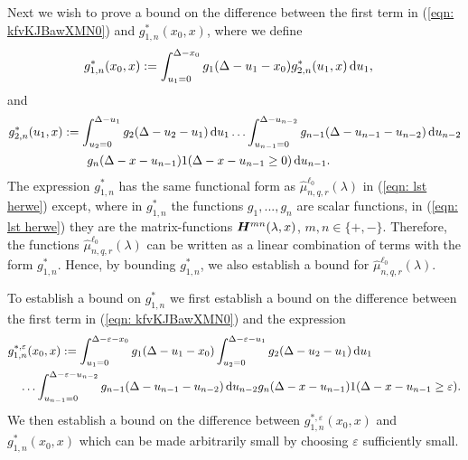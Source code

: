 Next we wish to prove a bound on the difference between the first term in (\ref{eqn: kfvKJBawXMN0}) and \(g^*_{1,n}(x_0,x)\), where we define 
	\begin{align}
		g^*_{1,n}(x_0,x) &:= \int_{u_1=0}^{\Delta-x_0}g_1(\Delta - u_1 - x_0)g^*_{2,n}(u_1,x)\, \mathrm{d} u_1,
	\end{align}
	and
	\begin{align}
		g^*_{2,n}(u_1,x) &:= \int_{u_2=0}^{\Delta-u_1}g_2(\Delta - u_2 - u_1)\, \mathrm{d} u_1 \dots \nonumber 
            	\int_{u_{n-1}=0}^{\Delta-u_{n-2}} g_{n-1}(\Delta - u_{n-1} - u_{n-2}) \, \mathrm{d} u_{n-2}
            	\\&\qquad{}g_{n}(\Delta - x-u_{n-1})1(\Delta-x-u_{n-1}\geq0)\, \mathrm{d} u_{n-1}.
	\end{align}
	The expression \(g^*_{1,n}\) has the same functional form as \(\widehat \mu^{\ell_0}_{n,q,r}(\lambda)\) in (\ref{eqn: lst herwe}) except, where in \(g^*_{1,n}\) the functions \(g_1,...,g_n\) are scalar functions, in (\ref{eqn: lst herwe}) they are the matrix-functions \(\boldsymbol H^{mn}(\lambda,x)\), \(m,n\in\{+,-\}\). Therefore, the functions \(\widehat \mu^{\ell_0}_{n,q,r}(\lambda)\) can be written as a linear combination of terms with the form \(g^*_{1,n}\). Hence, by bounding \(g^*_{1,n}\), we also establish a bound for \(\widehat \mu^{\ell_0}_{n,q,r}(\lambda)\).

To establish a bound on \(g^*_{1,n}\) we first establish a bound on the difference between the first term in (\ref{eqn: kfvKJBawXMN0}) and the expression 
	\begin{align}
		&g^{*,\varepsilon}_{1,n}(x_0,x) := 
		\int_{u_1=0}^{\Delta-\varepsilon-x_0}g_1(\Delta - u_1 - x_0)
		\int_{u_2=0}^{\Delta-\varepsilon-u_1}g_2(\Delta - u_2 - u_1)\, \mathrm{d} u_1  \nonumber 
		\\&\quad\hdots 
            	\int_{u_{n-1}=0}^{\Delta-\varepsilon-u_{n-2}} g_{n-1}(\Delta - u_{n-1} - u_{n-2}) \, \mathrm{d} u_{n-2}
            	g_{n}(\Delta-x-u_{n-1}) 
		1(\Delta-x-u_{n-1}\geq\varepsilon).
	\end{align}
	We then establish a bound on the difference between \(g^{*,\varepsilon}_{1,n}(x_0,x)\) and \(g^{*}_{1,n}(x_0,x)\) which can be made arbitrarily small by choosing \(\varepsilon\) sufficiently small. 

